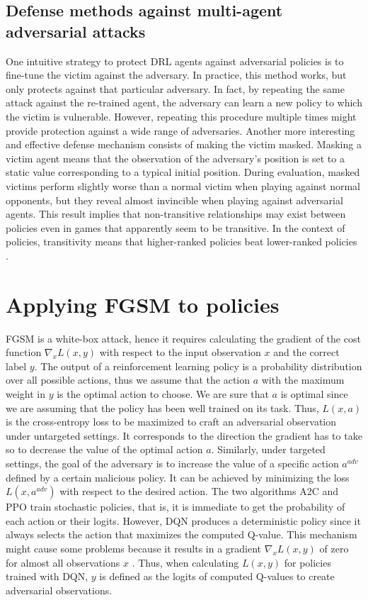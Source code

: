 \subsection{Defense methods against multi-agent adversarial attacks}
One intuitive strategy to protect DRL agents against adversarial policies is to fine-tune the victim against the adversary. In practice, this method works, but only protects against that particular adversary. In fact, by repeating the same attack \cite{gleave2020adversarial} against the re-trained agent, the adversary can learn a new policy to which the victim is vulnerable. However, repeating this procedure multiple times might provide protection against a wide range of adversaries. Another more interesting and effective defense mechanism consists of making the victim masked. Masking a victim agent means that the observation of the adversary’s position is set to a static value corresponding to a typical initial position. During evaluation, masked victims perform slightly worse than a normal victim when playing against normal opponents, but they reveal almost invincible when playing against adversarial agents. This result implies that non-transitive relationships may exist between policies even in games that apparently seem to be transitive. In the context of policies, transitivity means that higher-ranked policies beat lower-ranked policies \cite{gleave2020adversarial}.

\section{Applying FGSM to policies}
FGSM is a white-box attack, hence it requires calculating the gradient of the cost function \(\nabla_x L(x, y)\) with respect to the input observation \(x\) and the correct label \(y\). The output of a reinforcement learning policy is a probability distribution over all possible actions, thus we assume that the action \(a\) with the maximum weight in \(y\) is the optimal action to choose. We are sure that \(a\) is optimal since we are assuming that the policy has been well trained on its task. Thus, \(L(x, a)\) is the cross-entropy loss to be maximized to craft an adversarial observation under untargeted settings. It corresponds to the direction the gradient has to take so to decrease the value of the optimal action \(a\). Similarly, under targeted settings, the goal of the adversary is to increase the value of a specific action \(a^{adv}\) defined by a certain malicious policy. It can be achieved by minimizing the loss \(L(x, a^{adv})\) with respect to the desired action. The two algorithms A2C and PPO train stochastic policies, that is, it is immediate to get the probability of each action or their logits. However, DQN produces a deterministic policy since it always selects the action that maximizes the computed Q-value. This mechanism might cause some problems because it results in a gradient \(\nabla_x L(x, y)\) of zero for almost all observations \(x\) \cite{huang2017adversarial}. Thus, when calculating \(L(x, y)\) for policies trained with DQN, \(y\) is defined as the logits of computed Q-values to create adversarial observations.